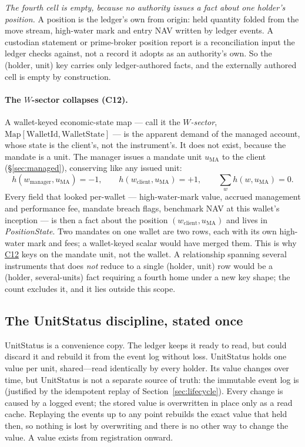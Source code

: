 \documentclass[11pt,a4paper]{article}
\begin{document}
\emph{The fourth cell is empty, because no authority issues a fact about one holder's
position.} A position is the ledger's own from origin: held quantity folded from the move
stream, high-water mark and entry NAV written by ledger events. A custodian statement or
prime-broker position report is a reconciliation input the ledger checks against, not a
record it adopts as an authority's own. So the (holder, unit) key carries only
ledger-authored facts, and the externally authored cell is empty by construction.

\paragraph{The $W$-sector collapses (C12).}
A wallet-keyed economic-state map --- call it the \emph{$W$-sector},
$\mathrm{Map}[\mathrm{WalletId},\mathrm{WalletState}]$ --- is the apparent demand of the
managed account, whose state is the client's, not the instrument's. It does not exist,
because the mandate is a unit. The manager issues a mandate unit $u_{\mathrm{MA}}$ to the
client (\S\ref{sec:managed}), conserving like any issued unit:
\[
h(w_{\mathrm{manager}},u_{\mathrm{MA}})=-1,\qquad
h(w_{\mathrm{client}},u_{\mathrm{MA}})=+1,\qquad
\sum_{w}h(w,u_{\mathrm{MA}})=0 .
\]
Every field that looked per-wallet --- high-water-mark value, accrued management and
performance fee, mandate breach flags, benchmark NAV at this wallet's inception --- is then
a fact about the position $(w_{\mathrm{client}},u_{\mathrm{MA}})$ and lives in
\emph{PositionState}. Two mandates on one wallet are two rows, each with its own
high-water mark and fees; a wallet-keyed scalar would have merged them. This is why
\hyperref[cond:C12]{C12} keys on the mandate unit, not the wallet. A relationship spanning
several instruments that does \emph{not} reduce to a single (holder, unit) row would be a
(holder, several-units) fact requiring a fourth home under a new key shape; the count
excludes it, and it lies outside this scope.

\subsection{The UnitStatus discipline, stated once}
\label{sec:states-unitstatus}

UnitStatus is a convenience copy. The ledger keeps it ready to read, but could discard it
and rebuild it from the event log without loss. UnitStatus holds one value per unit,
shared---read identically by every holder. Its
value changes over time, but UnitStatus is not a separate source of truth: the immutable
event log is (justified by the idempotent replay of Section~\ref{sec:lifecycle}).
Every change is caused by a logged event; the stored value is overwritten in
place only as a read cache. Replaying the events up to any point rebuilds the exact value
that held then, so nothing is lost by overwriting and there is no other way to change the
value. A value exists from registration onward.
\end{document}
